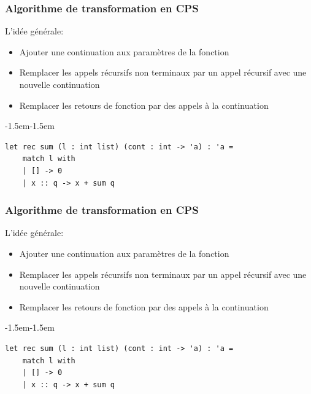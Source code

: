 \addtocounter{framenumber}{-1}
\begin{frame}[fragile,t]
    \frametitle{Algorithme de transformation en CPS}

    L'idée générale:
    \begin{itemize}
        \item[\textcolor{orange}{$\blacktriangleright$}] Ajouter une continuation aux paramètres de la fonction
        \item Remplacer les appels récursifs non terminaux par un appel récursif
              avec une nouvelle continuation
        \item Remplacer les retours de fonction par des appels à la continuation
    \end{itemize}

    \vspace{0.1cm}

    \begin{adjustwidth}{-1.5em}{-1.5em}
        \begin{verbatim}
let rec sum (l : int list) (cont : int -> 'a) : 'a =
    match l with
    | [] -> 0
    | x :: q -> x + sum q
        \end{verbatim}
    \end{adjustwidth}
\end{frame}

\addtocounter{framenumber}{-1}
\begin{frame}[fragile,t]
    \frametitle{Algorithme de transformation en CPS}

    L'idée générale:
    \begin{itemize}
        \item Ajouter une continuation aux paramètres de la fonction
        \item[\textcolor{orange}{$\blacktriangleright$}] Remplacer les appels récursifs non terminaux par un appel récursif
              avec une nouvelle continuation
        \item Remplacer les retours de fonction par des appels à la continuation
    \end{itemize}

    \vspace{0.1cm}

    \begin{adjustwidth}{-1.5em}{-1.5em}
        \begin{verbatim}
let rec sum (l : int list) (cont : int -> 'a) : 'a =
    match l with
    | [] -> 0
    | x :: q -> x + sum q
        \end{verbatim}
    \end{adjustwidth}

\end{frame}


